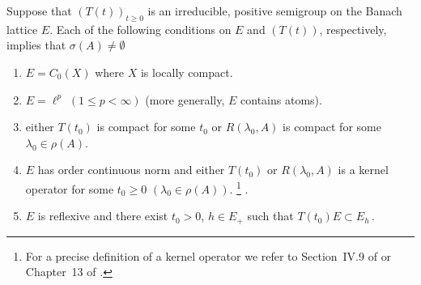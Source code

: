\begin{theorem}\label{thm:c3-3.7}

Suppose that $(T(t))_{t\geq 0}$ is an irreducible, positive semigroup on the Banach lattice $E$.
Each of the following conditions on $E$ and $(T(t))$, respectively, implies that $\sigma(A) \neq \emptyset$

\begin{enumerate}[\upshape (i)]
	\item
	$E = C_{0}(X)$ where $X$ is locally compact.

	\item 
	$E = \ell^{p}$ $(1 \leq p < \infty)$ (more generally, $E$ contains atoms).

	\item either $T(t_{0})$ is compact for some $t_{0}$ or $R(\lambda_{0},A)$ is compact for some $\lambda_{0} \in \rho(A)$.
%
%
	\item 
	$E$ has order continuous norm and either $T(t_{0})$ or $R(\lambda_{0},A)$ is a kernel operator for some $t_{0} \geq 0$ $(\lambda_{0} \in \rho(A))$. 	
	\footnote[1]{For a precise definition of a kernel operator we refer to Section~IV.9 of \citet{schaefer:1974} or Chapter~13 of \citet{zaanen:1983}.}
	.

	\item 
	$E$ is reflexive and there exist $t_{0} > 0$, $h \in E_{+}$ such that $T(t_{0})E \subset E_{h}$\,.
\end{enumerate}
\end{theorem}
